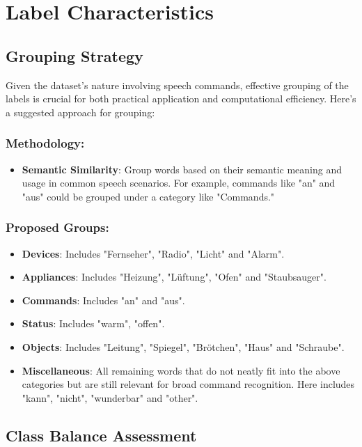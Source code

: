 \section{Label Characteristics}

\subsection{Grouping Strategy}

Given the dataset's nature involving speech commands, effective grouping of the labels is crucial for both practical application and computational efficiency. Here’s a suggested approach for grouping:

\subsubsection{Methodology:}

\begin{itemize}
    \item \textbf{Semantic Similarity}: Group words based on their semantic meaning and usage in common speech scenarios. For example, commands like "an" and "aus" could be grouped under a category like "Commands."
\end{itemize}

\subsubsection{Proposed Groups:}

\begin{itemize}
    \item \textbf{Devices}: Includes "Fernseher", "Radio", "Licht" and "Alarm".
    \item \textbf{Appliances}: Includes "Heizung", "Lüftung", "Ofen" and "Staubsauger".
    \item \textbf{Commands}: Includes "an" and "aus".
    \item \textbf{Status}: Includes "warm", "offen".
    \item \textbf{Objects}: Includes "Leitung", "Spiegel", "Brötchen", "Haus" and "Schraube".
    \item \textbf{Miscellaneous}: All remaining words that do not neatly fit into the above categories but are still relevant for broad command recognition. Here includes "kann", "nicht", "wunderbar" and "other".
\end{itemize}

\subsection{Class Balance Assessment}

